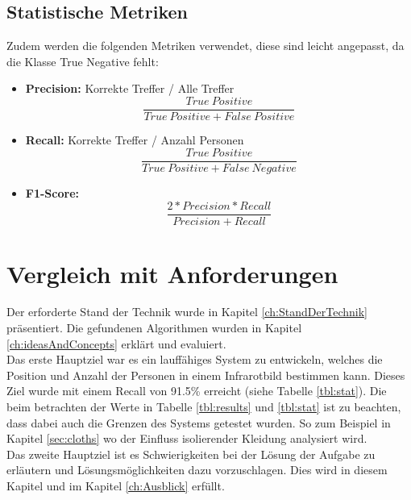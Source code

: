 \subsection{Statistische Metriken}
\noindent Zudem werden die folgenden Metriken verwendet, diese sind leicht angepasst, da die Klasse True Negative fehlt:

\begin{itemize}
	\item \textbf{Precision:} Korrekte Treffer / Alle Treffer\[\dfrac{True\: Positive}{True\: Positive + False\: Positive}\]
	\item \textbf{Recall:} Korrekte Treffer / Anzahl Personen\[\dfrac{True\: Positive}{True\: Positive + False\: Negative}\]
	\item \textbf{F1-Score:} \[\dfrac{2*Precision*Recall}{Precision + Recall}\]
\end{itemize}


\section{Vergleich mit Anforderungen}
\label{sec:VergleichAnforderungen}

Der erforderte Stand der Technik wurde in Kapitel \ref{ch:StandDerTechnik} präsentiert. Die gefundenen Algorithmen wurden in Kapitel \ref{ch:ideasAndConcepts} erklärt und evaluiert.\\
Das erste Hauptziel war es ein lauffähiges System zu entwickeln, welches die Position und Anzahl der Personen in einem Infrarotbild bestimmen kann. Dieses Ziel wurde mit einem Recall von 91.5\%  erreicht (siehe Tabelle \ref{tbl:stat}). Die beim betrachten der Werte in Tabelle \ref{tbl:results} und \ref{tbl:stat} ist zu beachten, dass dabei auch die Grenzen des Systems getestet wurden. So zum Beispiel in Kapitel \ref{sec:cloths} wo der Einfluss isolierender Kleidung analysiert wird.\\
Das zweite Hauptziel ist es Schwierigkeiten bei der Lösung der Aufgabe zu erläutern und Lösungsmöglichkeiten dazu vorzuschlagen. Dies wird in diesem Kapitel und im Kapitel \ref{ch:Ausblick} erfüllt.

